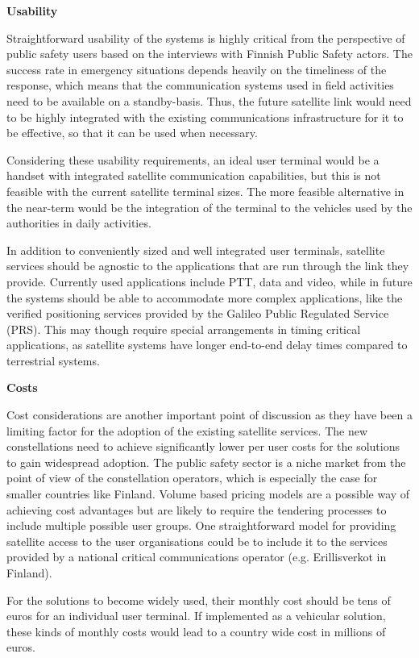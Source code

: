 \documentclass[english, 12pt, a4paper, elec, utf8, a-1b, online]{aaltothesis}
\begin{document}
\textbf{Usability}

Straightforward usability of the systems is highly critical from the perspective of public safety users based on the interviews with Finnish Public Safety actors. The success rate in emergency situations depends heavily on the timeliness of the response, which means that the communication systems used in field activities need to be available on a standby-basis. Thus, the future satellite link would need to be highly integrated with the existing communications infrastructure for it to be effective, so that it can be used when necessary.

Considering these usability requirements, an ideal user terminal would be a handset with integrated satellite communication capabilities, but this is not feasible with the current satellite terminal sizes. The more feasible alternative in the near-term would be the integration of the terminal to the vehicles used by the authorities in daily activities.

In addition to conveniently sized and well integrated user terminals, satellite services should be agnostic to the applications that are run through the link they provide. Currently used applications include PTT, data and video, while in future the systems should be able to accommodate more complex applications, like the verified positioning services provided by the Galileo Public Regulated Service (PRS). This may though require special arrangements in timing critical applications, as satellite systems have longer end-to-end delay times compared to terrestrial systems.

\textbf{Costs}

Cost considerations are another important point of discussion as they have been a limiting factor for the adoption of the existing satellite services. The new constellations need to achieve significantly lower per user costs for the solutions to gain widespread adoption. The public safety sector is a niche market from the point of view of the constellation operators, which is especially the case for smaller countries like Finland. Volume based pricing models are a possible way of achieving cost advantages but are likely to require the tendering processes to include multiple possible user groups. One straightforward model for providing satellite access to the user organisations could be to include it to the services provided by a national critical communications operator (e.g. Erillisverkot in Finland).

For the solutions to become widely used, their monthly cost should be tens of euros for an individual user terminal. If implemented as a vehicular solution, these kinds of monthly costs would lead to a country wide cost in millions of euros.
\end{document}
